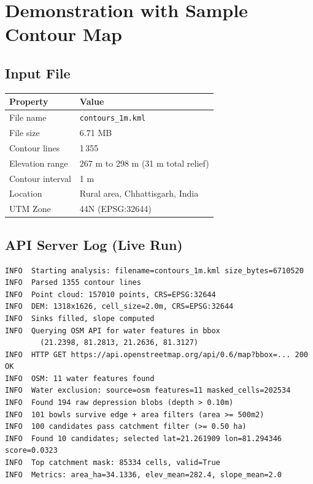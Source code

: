 \documentclass[12pt,a4paper]{article}
\begin{document}
\section{Demonstration with Sample Contour Map}

\subsection{Input File}

\begin{center}
\begin{tabular}{ll}
    \toprule
    \textbf{Property}     & \textbf{Value} \\
    \midrule
    File name             & \texttt{contours\_1m.kml} \\
    File size             & 6.71 MB \\
    Contour lines         & 1\,355 \\
    Elevation range       & 267 m to 298 m (31 m total relief) \\
    Contour interval      & 1 m \\
    Location              & Rural area, Chhattisgarh, India \\
    UTM Zone              & 44N (EPSG:32644) \\
    \bottomrule
\end{tabular}
\end{center}

\subsection{API Server Log (Live Run)}

\begin{lstlisting}[style=bash]
INFO  Starting analysis: filename=contours_1m.kml size_bytes=6710520
INFO  Parsed 1355 contour lines
INFO  Point cloud: 157010 points, CRS=EPSG:32644
INFO  DEM: 1318x1626, cell_size=2.0m, CRS=EPSG:32644
INFO  Sinks filled, slope computed
INFO  Querying OSM API for water features in bbox
        (21.2398, 81.2813, 21.2636, 81.3127)
INFO  HTTP GET https://api.openstreetmap.org/api/0.6/map?bbox=... 200 OK
INFO  OSM: 11 water features found
INFO  Water exclusion: source=osm features=11 masked_cells=202534
INFO  Found 194 raw depression blobs (depth > 0.10m)
INFO  101 bowls survive edge + area filters (area >= 500m2)
INFO  100 candidates pass catchment filter (>= 0.50 ha)
INFO  Found 10 candidates; selected lat=21.261909 lon=81.294346 score=0.0323
INFO  Top catchment mask: 85334 cells, valid=True
INFO  Metrics: area_ha=34.1336, elev_mean=282.4, slope_mean=2.0
\end{lstlisting}
\end{document}
